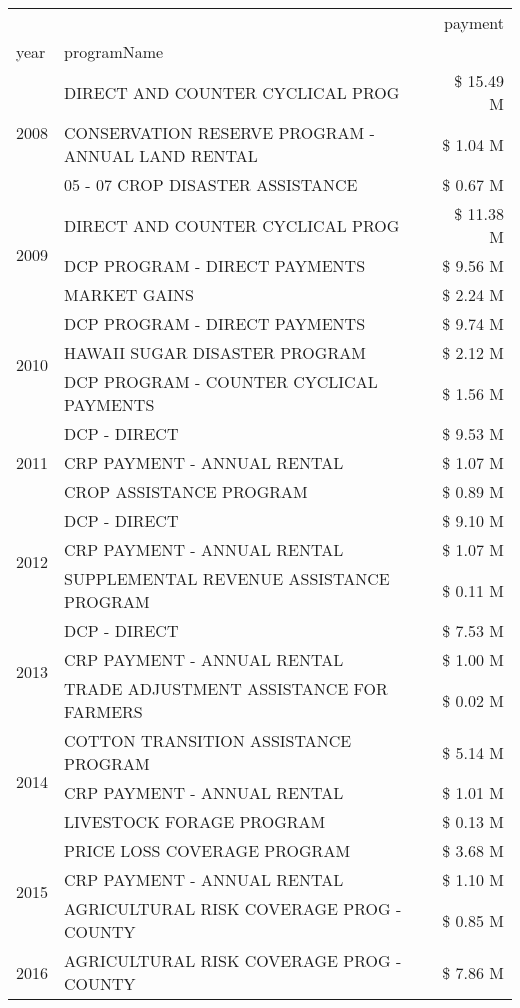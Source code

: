 \begin{tabular}{llr}
\toprule
 &  & payment \\
year & programName &  \\
\midrule
\multirow[t]{3}{*}{2008} & DIRECT AND COUNTER CYCLICAL PROG & \$ 15.49 M \\
 & CONSERVATION RESERVE PROGRAM - ANNUAL LAND RENTAL & \$ 1.04 M \\
 & 05 - 07 CROP DISASTER ASSISTANCE & \$ 0.67 M \\
\cline{1-3}
\multirow[t]{3}{*}{2009} & DIRECT AND COUNTER CYCLICAL PROG & \$ 11.38 M \\
 & DCP PROGRAM - DIRECT PAYMENTS & \$ 9.56 M \\
 & MARKET GAINS & \$ 2.24 M \\
\cline{1-3}
\multirow[t]{3}{*}{2010} & DCP PROGRAM - DIRECT PAYMENTS & \$ 9.74 M \\
 & HAWAII SUGAR DISASTER PROGRAM & \$ 2.12 M \\
 & DCP PROGRAM - COUNTER CYCLICAL PAYMENTS & \$ 1.56 M \\
\cline{1-3}
\multirow[t]{3}{*}{2011} & DCP - DIRECT & \$ 9.53 M \\
 & CRP PAYMENT - ANNUAL RENTAL & \$ 1.07 M \\
 & CROP ASSISTANCE PROGRAM & \$ 0.89 M \\
\cline{1-3}
\multirow[t]{3}{*}{2012} & DCP - DIRECT & \$ 9.10 M \\
 & CRP PAYMENT - ANNUAL RENTAL & \$ 1.07 M \\
 & SUPPLEMENTAL REVENUE ASSISTANCE PROGRAM & \$ 0.11 M \\
\cline{1-3}
\multirow[t]{3}{*}{2013} & DCP - DIRECT & \$ 7.53 M \\
 & CRP PAYMENT - ANNUAL RENTAL & \$ 1.00 M \\
 & TRADE ADJUSTMENT ASSISTANCE FOR FARMERS & \$ 0.02 M \\
\cline{1-3}
\multirow[t]{3}{*}{2014} & COTTON TRANSITION ASSISTANCE PROGRAM & \$ 5.14 M \\
 & CRP PAYMENT - ANNUAL RENTAL & \$ 1.01 M \\
 & LIVESTOCK FORAGE PROGRAM & \$ 0.13 M \\
\cline{1-3}
\multirow[t]{3}{*}{2015} & PRICE LOSS COVERAGE PROGRAM & \$ 3.68 M \\
 & CRP PAYMENT - ANNUAL RENTAL & \$ 1.10 M \\
 & AGRICULTURAL RISK COVERAGE PROG - COUNTY & \$ 0.85 M \\
\cline{1-3}
\multirow[t]{3}{*}{2016} & AGRICULTURAL RISK COVERAGE PROG - COUNTY & \$ 7.86 M \\

\end{tabular}

